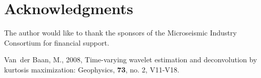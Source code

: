 %
\section{Acknowledgments}
%
The author would like to thank the sponsors of the Microseismic Industry Consortium for financial support.
%

\begin{thebibliography}{}
\itemsep0pt

Van~der Baan, M., 2008, {Time-varying wavelet estimation and deconvolution by
  kurtosis maximization}: Geophysics, {\bf 73}, no. 2, V11-V18.

\end{thebibliography}

